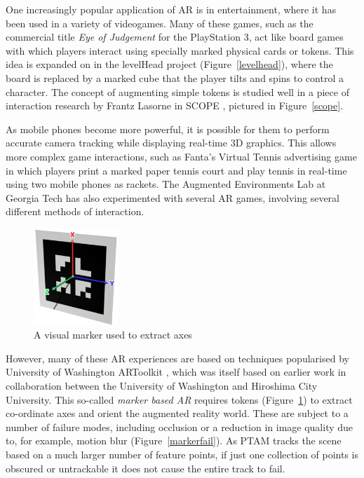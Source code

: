 \documentclass[a4paper,10pt]{article}
\begin{document}
One increasingly popular application of AR is in entertainment, where it has been used in a variety of videogames. Many of these games, such as the commercial title \textit{Eye of Judgement} \cite{eyeofjudgement} for the PlayStation 3, act like board games with which players interact using specially marked physical cards or tokens. This idea is expanded on in the levelHead \cite{levelhead} project (Figure~\ref{levelhead}), where the board is replaced by a marked cube that the player tilts and spins to control a character. The concept of augmenting simple tokens is studied well in a piece of interaction research by Frantz Lasorne in SCOPE \cite{scope}, pictured in Figure~\ref{scope}.

As mobile phones become more powerful, it is possible for them to perform accurate camera tracking while displaying real-time 3D graphics. This allows more complex game interactions, such as Fanta's Virtual Tennis\cite{fantatennis} advertising game in which players print a marked paper tennis court and play tennis in real-time using two mobile phones as rackets. The Augmented Environments Lab at Georgia Tech has also experimented with several AR games, involving several different methods of interaction.

\begin{figure}
  \vspace{-20pt}
  \begin{center}
    \includegraphics[width=120px]{marker-axis1}
  \end{center}
  \vspace{-10pt}
  \caption{A visual marker used to extract axes}
  \label{markerar}
\end{figure} 

However, many of these AR experiences are based on techniques popularised by University of Washington ARToolkit \cite{artk}, which was itself based on earlier work \cite{artkpaper} in collaboration between the University of Washington and Hiroshima City University. This so-called \textit{marker based AR} requires tokens (Figure~\ref{markerar}) to extract co-ordinate axes and orient the augmented reality world. These are subject to a number of failure modes, including occlusion or a reduction in image quality due to, for example, motion blur (Figure~\ref{markerfail}). As PTAM tracks the scene based on a much larger number of feature points, if just one collection of points is obscured or untrackable it does not cause the entire track to fail.
\end{document}
